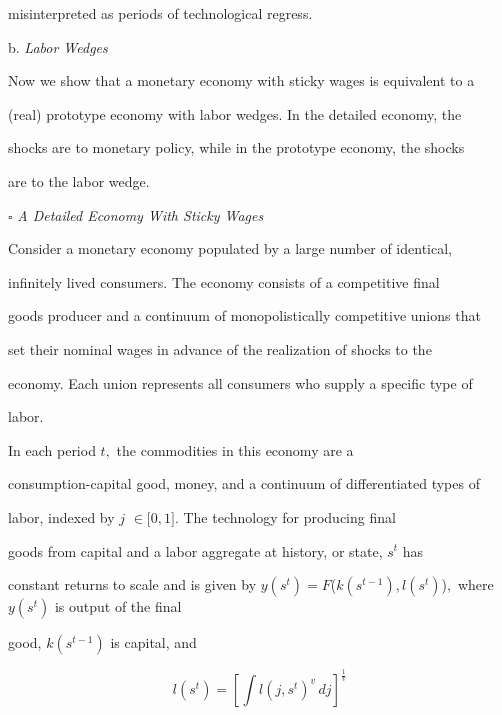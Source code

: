 \documentclass[fleqn,leqno,11pt]{article}
\begin{document}
misinterpreted as periods of technological regress.



\bigskip



\noindent b. \emph{Labor Wedges}



Now we show that a monetary economy with sticky wages is equivalent to a

(real) prototype economy with labor wedges. In the detailed economy, the

shocks are to monetary policy, while in the prototype economy, the shocks

are to the labor wedge.



\bigskip



\noindent $\square $ \emph{A Detailed Economy With Sticky Wages}



Consider a monetary economy populated by a large number of identical,

infinitely lived consumers. The economy consists of a competitive final

goods producer and a continuum of monopolistically competitive unions that

set their nominal wages in advance of the realization of shocks to the

economy. Each union represents all consumers who supply a specific type of

labor.



In each period $t,$ the commodities in this economy are a

consumption-capital good, money, and a continuum of differentiated types of

labor, indexed by $j$ $\in \lbrack 0,1]$. The technology for producing final

goods from capital and a labor aggregate at history, or state, $s^{t}$ has

constant returns to scale and is given by $y(s^{t})=F${\large (}$%

k(s^{t-1}),l(s^{t})${\large )}$,$ where $y(s^{t})$ is output of the final

good, $k(s^{t-1})$ is capital, and 

\begin{equation}

l(s^{t})=\left[ \int l(j,s^{t})^{v}\,dj\right] ^{\frac{1}{v}}  \label{labor}

\end{equation}
\end{document}
